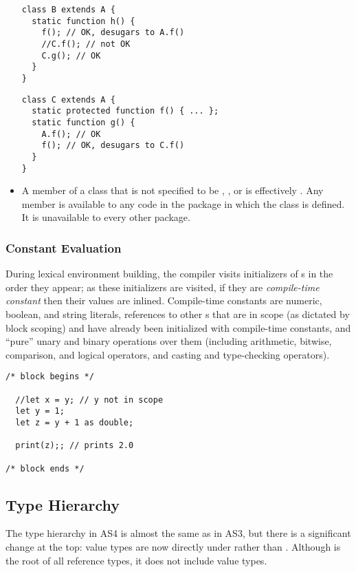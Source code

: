 \begin{itemize}
\begin{minipage}{\linewidth}
\begin{verbatim}
class B extends A {
  static function h() {
    f(); // OK, desugars to A.f()
    //C.f(); // not OK
    C.g(); // OK
  }
}
\end{verbatim}
\end{minipage}

\begin{minipage}{\linewidth}
\begin{verbatim}
class C extends A {
  static protected function f() { ... };
  static function g() {
    A.f(); // OK
    f(); // OK, desugars to C.f()
  }
}
\end{verbatim}
\end{minipage}

\item A member  of a class that is not specified to
  be , , or  is effectively
  . Any  member is available
  to any code in the package in which the class is defined. It is unavailable to
  every other package.

\end{itemize}

\subsubsection{Constant Evaluation}
\label{const-eval}

During lexical environment building, the compiler visits initializers
of s in the order they appear; as these initializers are
visited, if they are \emph{compile-time constant} then their values are inlined. Compile-time constants are numeric, boolean, and
string literals, references to other s that are in
scope (as dictated by block scoping) and have already been initialized with compile-time constants,
and ``pure'' unary and binary operations over them (including arithmetic,
bitwise, comparison, and logical operators, and casting and type-checking operators).

\begin{verbatim}
/* block begins */

  //let x = y; // y not in scope
  let y = 1;
  let z = y + 1 as double;

  print(z);; // prints 2.0

/* block ends */
\end{verbatim}


\subsection{Type Hierarchy}
The type hierarchy in AS4 is almost the same as in AS3, but there is a
significant change at the top: value types are now directly under
\code{*} rather than . Although  is the
root of all reference types, it does not include value types.

